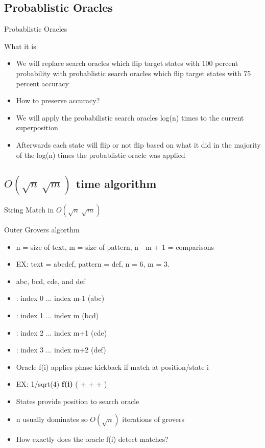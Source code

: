 \documentclass{beamer}
\begin{document}
\subsection{Probablistic Oracles}
\begin{frame}{Probablistic Oracles}
  \begin{block}{What it is}
    \begin{itemize}
      \item We will replace search oracles which flip target states with 100 percent probability with probablistic search oracles which flip target states with 75 percent accuracy
      \item How to preserve accuracy?
      \item We will apply the probabilistic search oracles log(n) times to the current superposition
      \item Afterwards each state will flip or not flip based on what it did in the majority of the log(n) times the probablistic oracle was applied
    \end{itemize}
  \end{block}
\end{frame}

\subsection{\(O(\sqrt{n}\ \sqrt{m})\) time algorithm}
\begin{frame}{String Match in \(O(\sqrt{n}\ \sqrt{m} )\)}
  \begin{block}{Outer Grovers algorthm}
    \begin{itemize}
      \item n = size of text, m = size of pattern, n - m + 1 = comparisons
      \item EX: text = abcdef, pattern = def, n = 6, m = 3.
      \item abc, bcd, cde, and def
      \item {}: index 0 ... index m-1 (abc)
      \item {}: index 1 ... index m   (bcd)
      \item {}: index 2 ... index m+1 (cde)
      \item {}: index 3 ... index m+2 (def)
      \item Oracle f(i) applies phase kickback if match at position/state i
      \item EX: 1/sqrt(4) \textbf{f(i)} ( +  +  + )
      \item States provide position to search oracle
      \item n usually dominates so \(O(\sqrt{n})\) iterations of grovers
      \item How exactly does the oracle f(i) detect matches?
    \end{itemize}
  \end{block}
\end{frame}
\end{document}

